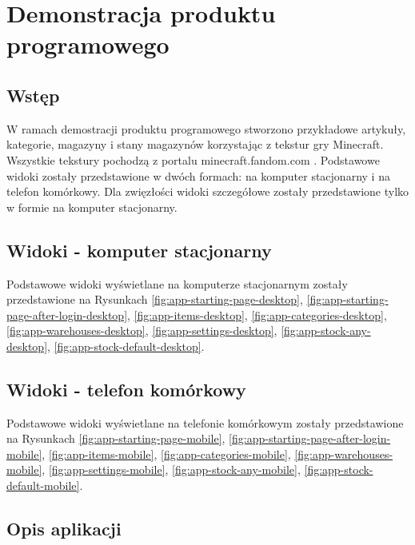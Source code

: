\documentclass[../main.tex]{subfiles}
\begin{document}
\newcommand\getImageWidth{1\linewidth}
\newcommand\getImageHeight{0.3\pdfpageheight}

\section{Demonstracja produktu programowego}
    \subsection{Wstęp}
        W ramach demostracji produktu programowego stworzono przykładowe artykuły, kategorie, magazyny i stany magazynów korzystając z tekstur gry Minecraft. Wszystkie tekstury pochodzą z portalu minecraft.fandom.com \cite{minecraft-images}. Podstawowe widoki zostały przedstawione w dwóch formach: na komputer stacjonarny i na telefon komórkowy. Dla zwięzłości widoki szczegółowe zostały przedstawione tylko w formie na komputer stacjonarny.
    \subsection{Widoki - komputer stacjonarny}
        Podstawowe widoki wyświetlane na komputerze stacjonarnym zostały przedstawione na Rysunkach 
        \ref{fig:app-starting-page-desktop},
        \ref{fig:app-starting-page-after-login-desktop},
        \ref{fig:app-items-desktop}, 
        \ref{fig:app-categories-desktop}, 
        \ref{fig:app-warehouses-desktop}, 
        \ref{fig:app-settings-desktop},
        \ref{fig:app-stock-any-desktop},
        \ref{fig:app-stock-default-desktop}.

    \subsection{Widoki - telefon komórkowy}
    Podstawowe widoki wyświetlane na telefonie komórkowym zostały przedstawione na Rysunkach 
        \ref{fig:app-starting-page-mobile}, 
        \ref{fig:app-starting-page-after-login-mobile}, 
        \ref{fig:app-items-mobile}, 
        \ref{fig:app-categories-mobile}, 
        \ref{fig:app-warehouses-mobile}, 
        \ref{fig:app-settings-mobile},
        \ref{fig:app-stock-any-mobile},
        \ref{fig:app-stock-default-mobile}.

    \subsection{Opis aplikacji}
\end{document}
